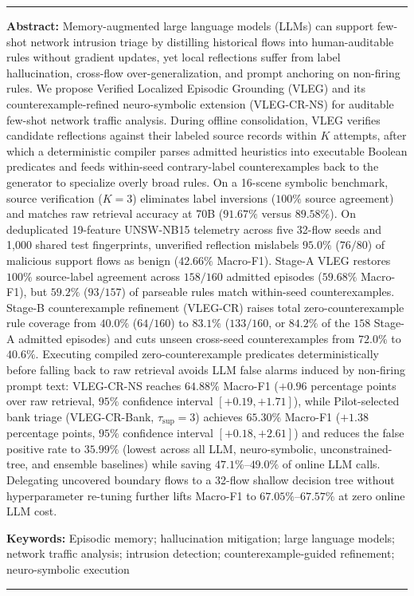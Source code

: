 \documentclass[11pt,letterpaper,onecolumn]{article}
\begin{document}
\vspace{0.55em}
\hrule
\vspace{0.45em}
{\fontsize{10}{12.5}\selectfont
\noindent\textbf{Abstract:} Memory-augmented large language models (LLMs) can support few-shot network intrusion triage by distilling historical flows into human-auditable rules without gradient updates, yet local reflections suffer from label hallucination, cross-flow over-generalization, and prompt anchoring on non-firing rules. We propose Verified Localized Episodic Grounding (VLEG) and its counterexample-refined neuro-symbolic extension (VLEG-CR-NS) for auditable few-shot network traffic analysis. During offline consolidation, VLEG verifies candidate reflections against their labeled source records within $K$ attempts, after which a deterministic compiler parses admitted heuristics into executable Boolean predicates and feeds within-seed contrary-label counterexamples back to the generator to specialize overly broad rules. On a 16-scene symbolic benchmark, source verification ($K=3$) eliminates label inversions ($100\%$ source agreement) and matches raw retrieval accuracy at 70B ($91.67\%$ versus $89.58\%$). On deduplicated 19-feature UNSW-NB15 telemetry across five 32-flow seeds and 1,000 shared test fingerprints, unverified reflection mislabels $95.0\%$ ($76/80$) of malicious support flows as benign ($42.66\%$ Macro-F1). Stage-A VLEG restores $100\%$ source-label agreement across $158/160$ admitted episodes ($59.68\%$ Macro-F1), but $59.2\%$ ($93/157$) of parseable rules match within-seed counterexamples. Stage-B counterexample refinement (VLEG-CR) raises total zero-counterexample rule coverage from $40.0\%$ ($64/160$) to $83.1\%$ ($133/160$, or $84.2\%$ of the $158$ Stage-A admitted episodes) and cuts unseen cross-seed counterexamples from $72.0\%$ to $40.6\%$. Executing compiled zero-counterexample predicates deterministically before falling back to raw retrieval avoids LLM false alarms induced by non-firing prompt text: VLEG-CR-NS reaches $64.88\%$ Macro-F1 ($+0.96$ percentage points over raw retrieval, $95\%$ confidence interval $[+0.19, +1.71]$), while Pilot-selected bank triage (VLEG-CR-Bank, $\tau_{\mathrm{sup}}=3$) achieves $65.30\%$ Macro-F1 ($+1.38$ percentage points, $95\%$ confidence interval $[+0.18, +2.61]$) and reduces the false positive rate to $35.99\%$ (lowest across all LLM, neuro-symbolic, unconstrained-tree, and ensemble baselines) while saving $47.1\%$--$49.0\%$ of online LLM calls. Delegating uncovered boundary flows to a 32-flow shallow decision tree without hyperparameter re-tuning further lifts Macro-F1 to $67.05\%$--$67.57\%$ at zero online LLM cost.\par
\vspace{0.35em}
\noindent\textbf{Keywords:} Episodic memory; hallucination mitigation; large language models; network traffic analysis; intrusion detection; counterexample-guided refinement; neuro-symbolic execution
\par}
\vspace{0.45em}
\hrule
\vspace{0.55em}
\end{document}
